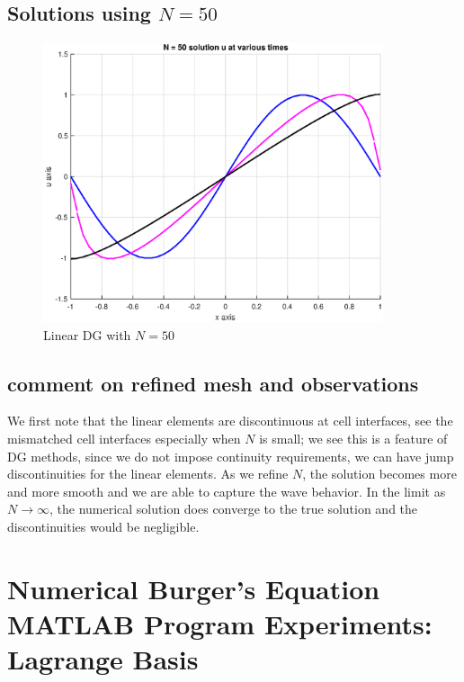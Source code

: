 \documentclass[12pt]{article} %
\newcommand{\1}[1]{\mathds{1}\left[#1\right]}
\begin{document}
\subsection{Solutions using $N=50$}
\newpage
\begin{figure}[t]
\includegraphics[width=10cm]{overlayn50.eps}
\centering
\caption{Linear DG with $N=50$}
\end{figure}
\newpage

\subsection{comment on refined mesh and observations}
\indent \indent We first note that the linear elements are discontinuous at cell interfaces, see the mismatched cell interfaces especially when $N$ is small; we see this is a feature of DG methods, since we do not impose continuity requirements, we can have jump discontinuities for the linear elements. As we refine $N$, the solution becomes more and more smooth and we are able to capture the wave behavior. In the limit as $N\rightarrow\infty$, the numerical solution does converge to the true solution and the discontinuities would be negligible.


\section{Numerical Burger's Equation MATLAB Program Experiments: Lagrange Basis}
\end{document}
